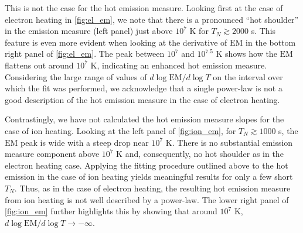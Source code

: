 \documentclass[apj]{emulateapj}
\begin{document}
	\par This is not the case for the hot emission measure. Looking first at the case of electron heating in \autoref{fig:el_em}, we note that there is a pronounced ``hot shoulder'' in the emission measure (left panel) just above $10^7$ K for $T_N\gtrsim2000$ s. This feature is even more evident when looking at the derivative of $\mathrm{EM}$ in the bottom right panel of \autoref{fig:el_em}. The peak between $10^7$ and $10^{7.5}$ K shows how the $\mathrm{EM}$ flattens out around $10^7$ K, indicating an enhanced hot emission measure. Considering the large range of values of $d\log{\mathrm{EM}}/d\log{T}$ on the interval over which the fit was performed, we acknowledge that a single power-law is not a good description of the hot emission measure in the case of electron heating.
	\par Contrastingly, we have not calculated the hot emission measure slopes for the case of ion heating. Looking at the left panel of \autoref{fig:ion_em}, for $T_N\gtrsim1000$ s, the $\mathrm{EM}$ peak is wide with a steep drop near $10^7$ K. There is no substantial emission measure component above $10^7$ K and, consequently, no hot shoulder as in the electron heating case. Applying the fitting procedure outlined above to the hot emission in the case of ion heating yields meaningful results for only a few short $T_N$. Thus, as in the case of electron heating, the resulting hot emission measure from ion heating is not well described by a power-law. The lower right panel of \autoref{fig:ion_em} further highlights this by showing that around $10^7$ K, $d\log{\mathrm{EM}}/d\log{T}\to-\infty$.
\end{document}
